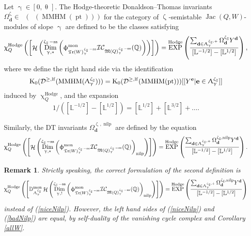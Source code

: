 \documentclass[a4paper,10pt]{amsart}
\newtheorem{remark}[theorem]{Remark}
\newcommand{\dd}{\mathbf{d}}
\newcommand{\DD}{\mathbb{D}}
\newcommand{\ee}{\mathbf{e}}
\newcommand{\LL}{\mathbb{L}}
\newcommand{\WWW}{\mathfrak{Tr}(W)}
\newcommand{\Mst}{\mathfrak{M}}
\newcommand{\ICS}{\mathcal{IC}}
\newcommand{\phim}[1]{\phi^{\mon}_{#1}}
\renewcommand{\theta}{\uptheta}
\renewcommand{\gamma}{\upgamma}
\renewcommand{\zeta}{\upzeta}
\renewcommand{\chi}{\upchi}
\renewcommand{\Lambda}{\Uplambda}
\renewcommand{\phi}{\upphi}
\DeclareMathOperator{\sst}{-ss}
\DeclareMathOperator{\nilp}{nilp}
\DeclareMathOperator{\KK}{K_0}
\DeclareMathOperator{\Dim}{Dim}
\DeclareMathOperator{\Hodge}{Hodge}
\DeclareMathOperator{\mon}{mon}
\DeclareMathOperator{\MMHM}{MMHM}
\DeclareMathOperator{\Jac}{Jac}
\DeclareMathOperator{\pt}{pt}
\DeclareMathOperator{\EXP}{EXP}
\DeclareMathOperator{\Ss}{\overline{s}}
\DeclareMathOperator{\Ho}{\mathcal{H}}
\DeclareMathOperator{\Dulf}{\mathcal{D}^{\geq, lf}}
\begin{document}
Let $\gamma\in [0,\theta_{\Ss}]$.  The Hodge-theoretic Donaldson--Thomas invariants $\Omega_{\dd}^{\zeta_{\Ss}}\in\KK(\Dulf(\MMHM(\pt)))$ for the category of $\zeta_{\Ss}$-semistable $\Jac(Q,W)$-modules of slope $\gamma$ are defined to be the classes satisfying
\begin{equation}
\chi_Q^{\Hodge}\left(\left[\Ho\left(\Dim_{\gamma,*}^{\zeta_{\Ss}\sst}\left(\phim{\WWW^{\zeta_{\Ss}\sst}_{\gamma}}\ICS_{\Mst(Q)^{\zeta_{\Ss}\sst}_{\gamma}}(\mathbb{Q})\right)\right)\right]\right)= \EXP^{\Hodge}\left(\frac{\sum_{\dd\in\Lambda^{\zeta_{\Ss},+}_{\gamma}}\Omega^{\zeta_{\Ss}}_{\dd}Y^{\dd}}{[\mathbb{L}^{-1/2}]-[\mathbb{L}^{1/2}]}\right),
\end{equation}
where we define the right hand side via the identification 
\[
\KK(\Dulf(\MMHM(\Lambda_{\gamma}^{\zeta_{\Ss}})))=\KK(\Dulf(\MMHM(\pt)))[[Y^{\ee}|\ee\in \Lambda^{\zeta_{\Ss}}_{\gamma}]]
\]
induced by $\chi_Q^{\Hodge}$, and the expansion
\[
1/([\LL^{-1/2}]-[\LL^{1/2}])=[\LL^{1/2}]+[\LL^{3/2}]+\ldots.
\]

Similarly, the DT invariants $\Omega_{\dd}^{\zeta_{\Ss},\nilp}$ are defined by the equation
\begin{equation}
\label{niceNilp}
\chi_Q^{\Hodge}\left(\left[\Ho\left(\Dim_{\gamma,*}^{\zeta_{\Ss}\sst}\left(\phim{\WWW^{\zeta_{\Ss}\sst}_{\gamma}}\ICS_{\Mst(Q)^{\zeta_{\Ss}\sst}_{\gamma}}(\mathbb{Q})\right)_{\nilp}\right)\right]\right)= \EXP^{\Hodge}\left(\frac{\sum_{\dd\in\Lambda^{\zeta_{\Ss},+}_{\gamma}}\Omega^{\zeta_{\Ss},\nilp}_{\dd}Y^{\dd}}{[\mathbb{L}^{-1/2}]-[\mathbb{L}^{1/2}]}\right).
\end{equation}
\begin{remark}\label{VerSt}
Strictly speaking, the correct formulation of the second definition is
\begin{equation}
\label{badNilp}
\chi_Q^{\Hodge}\left(\left[\DD_{\Lambda_{\gamma}^{\zeta_{\Ss}}}^{\mon}\Ho\left(\Dim_{\gamma,!}^{\zeta_{\Ss}\sst}\left(\phim{\WWW^{\zeta_{\Ss}\sst}_{\gamma}}\ICS_{\Mst(Q)^{\zeta_{\Ss}\sst}_{\gamma}}(\mathbb{Q})\right)_{\nilp}\right)\right]\right)= \EXP^{\Hodge}\left(\frac{\sum_{\dd\in\Lambda^{\zeta_{\Ss},+}_{\gamma}}\Omega^{\zeta_{\Ss},\nilp}_{\dd}Y^{\dd}}{[\mathbb{L}^{-1/2}]-[\mathbb{L}^{1/2}]}\right)
\end{equation}
instead of (\ref{niceNilp}).  However, the left hand sides of (\ref{niceNilp}) and (\ref{badNilp}) are equal, by self-duality of the vanishing cycle complex and Corollary \ref{allW}.
\end{remark}
\end{document}
